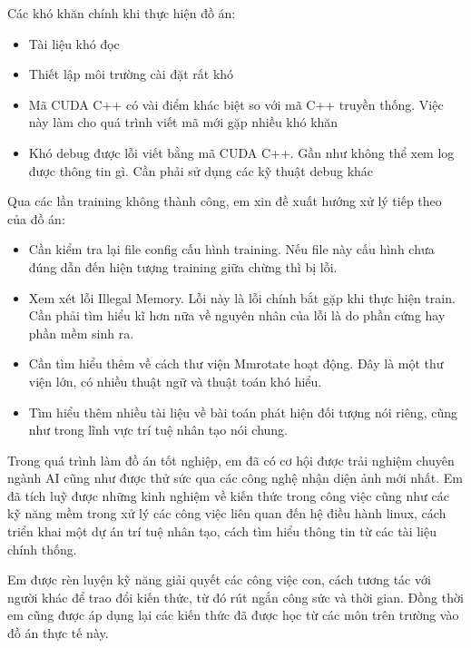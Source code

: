 \documentclass[12pt,a4paper,openany,oneside]{report}
\begin{document}
Các khó khăn chính khi thực hiện đồ án: 
\begin{itemize}
	\item Tài liệu khó đọc
	\item Thiết lập môi trường cài đặt rất khó
	\item Mã CUDA C++ có vài điểm khác biệt so với mã C++ truyền thống. Việc này làm cho quá trình viết mã mới gặp nhiều khó khăn
	\item Khó debug được lỗi viết bằng mã CUDA C++. Gần như không thể xem log được thông tin gì. Cần phải sử dụng các kỹ thuật debug khác
\end{itemize}

Qua các lần training không thành công, em xin đề xuất hướng xử lý tiếp theo của đồ án:
\begin{itemize}
	\item Cần kiểm tra lại file config cấu hình training. Nếu file này cấu hình chưa đúng dẫn đến hiện tượng training giữa chừng thì bị lỗi.
	\item Xem xét lỗi Illegal Memory. Lỗi này là lỗi chính bắt gặp khi thực hiện train. Cần phải tìm hiểu kĩ hơn nữa về nguyên nhân của lỗi là do phần cứng hay phần mềm sinh ra.
	\item Cần tìm hiểu thêm về cách thư viện Mmrotate hoạt động. Đây là một thư viện lớn, có nhiều thuật ngữ và thuật toán khó hiểu. 
	\item Tìm hiểu thêm nhiều tài liệu về bài toán phát hiện đối tượng nói riêng, cũng như trong lĩnh vực trí tuệ nhân tạo nói chung.
\end{itemize}

Trong quá trình làm đồ án tốt nghiệp, em đã có cơ hội được trải nghiệm chuyên ngành AI cũng như được thử sức qua các công nghệ nhận diện ảnh mới nhất. Em đã tích luỹ được những kinh nghiệm về kiến thức trong công việc cũng như các kỹ năng mềm trong xử lý các công việc liên quan đến hệ điều hành linux, cách triển khai một dự án trí tuệ nhân tạo, cách tìm hiểu thông tin từ các tài liệu chính thống.
 
Em được rèn luyện kỹ năng giải quyết các công việc con, cách tương tác với người khác để trao đổi kiến thức, từ đó rút ngắn công sức và thời gian. Đồng thời em cũng được áp dụng lại các kiến thức đã được học từ các môn trên trường vào đồ án thực tế này.


\end{document}
